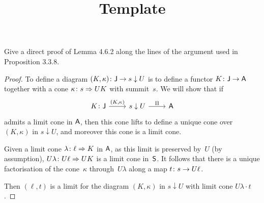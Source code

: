 \documentclass[../../solutions]{subfiles}
\title{Template}
\author{}
\begin{document}
\maketitle

%   

\begin{exercise}
  Give a direct proof of Lemma 4.6.2 along the lines of the argument
  used in Proposition 3.3.8.
\end{exercise}

\begin{proof}
  To define a diagram ${(K,\kappa)}\colon{{\mathsf{J}}}\to{s\downarrow U}$ is to
  define a functor ${K}\colon{{\mathsf{J}}}\to{{\mathsf{A}}}$ together with a cone
  ${\kappa}\colon{s}\Rightarrow{UK}$ with summit~$s$.  We will show that if
  $$
  \begin{tikzcd}
    K\colon \sJ \ar[r, "{(K,\kappa)}"]
    & s\downarrow U \ar[r, "\Pi"]
    & \sA
  \end{tikzcd}
  $$
  admits a limit cone in ${\mathsf{A}}$, then this cone lifts to define a
  unique cone over $(K,\kappa)$ in $s\downarrow U$, and moreover this
  cone is a limit cone.

  Given a limit cone ${\lambda}\colon{\ell}\Rightarrow{K}$ in ${\mathsf{A}}$, as this limit
  is preserved by~$U$ (by assumption), ${U\lambda}\colon{U\ell}\Rightarrow{UK}$ is
  a limit cone in~${\mathsf{S}}$.  It follows that there is a unique
  factorisation of the cone~$\kappa$ through~$U\lambda$ along a map
  ${t}\colon{s}\to{U\ell}$.

  Then $(\ell, t)$ is a limit for the diagram $(K,\kappa)$ in
  $s\downarrow U$ with limit cone $U\lambda\cdot t$.
\end{proof}
\end{document}
